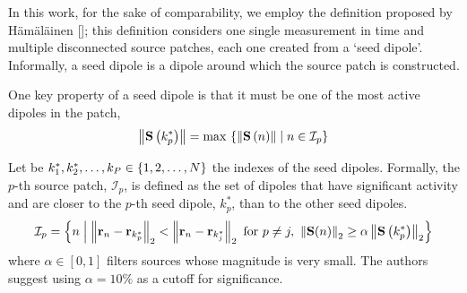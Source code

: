 

%
%

In this work, for the sake of comparability,
%
we employ the definition proposed by H\"{a}m\"{a}l\"{a}inen []; this definition considers one single measurement in time and multiple disconnected source patches, each one created from a `seed dipole'. 
%
Informally, a seed dipole is a dipole around which the source patch is constructed.

One key property of a seed dipole is that it must be one of the most active dipoles in the patch,
\begin{equation}
    \left\lVert \mathbf{S}\left( k_p^* \right) \right\rVert = \max\, 
    \left\{  \left\lVert \mathbf{S}\left( n \right) \right\rVert \;\middle|\; n\in \mathcal{I}_p  \right\}
\end{equation}

Let be $k_1^*, k_2^*, \dots, k_{P} \in \left\{ 1, 2, \dots, N \right\}$ the indexes of the seed dipoles.
%
Formally, the $p$-th source patch, $\mathcal{I}_p$, is defined as the set of dipoles that have significant activity and are closer to the $p$-th seed dipole, $k_p^*$, than to the other seed dipoles.
%
\begin{equation}
    \mathcal{I}_p = 
    \left\{ n 
    \;\middle|\;
    \left\lVert \mathbf{r}_n-\mathbf{r}_{k_p^*} \right\rVert_2 < \left\lVert \mathbf{r}_n-\mathbf{r}_{k_j^*} \right\rVert_2
    \text{ for } p\neq j,
    \,\,
    \left\lVert \mathbf{S}(n) \right\rVert_2 \geq 
    \alpha \left\lVert \mathbf{S} \left( k_p^* \right) \right\rVert_2
     \right\}
\end{equation}
where $\alpha\in [0,1]$ filters sources whose magnitude is very small.
%
The authors suggest using $\alpha = 10\%$ as a cutoff for significance.


